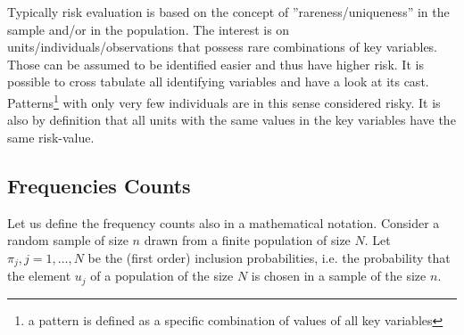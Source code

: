 \documentclass[12pt]{article}
\begin{document}
Typically risk evaluation is based on the concept of ''rareness/uniqueness'' in the sample and/or in the 
population. The interest is on units/individuals/observations that possess rare combinations of key variables.
Those can be assumed to be identified easier and thus have higher risk. It is possible 
to cross tabulate all identifying variables and have a look at its cast. 
Patterns\footnote{a pattern is defined as a specific combination of values of all key variables} 
with only very few individuals are in this sense considered risky. It is also by definition that 
all units with the same values in the key variables have the same risk-value. \\


\subsection{Frequencies Counts}\label{method:Freq} 

Let us define the frequency counts also in a mathematical notation. 
Consider a random sample of size $n$ drawn from a finite population of size $N$. Let
$\pi_{j}, j = 1, \ldots, N$ be the (first order) 
inclusion probabilities, i.e. the
probability that the element $u_j$ of a population of the size $N$ is chosen 
in a sample of the size $n$. 
\end{document}

